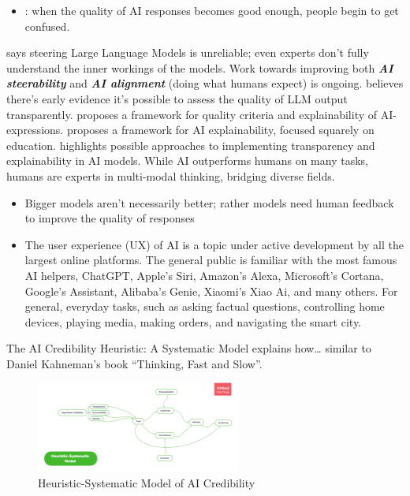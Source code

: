 \documentclass[
  letterpaper,
  DIV=11,
  numbers=noendperiod]{scrartcl}
\providecommand{\tightlist}{%
  \setlength{\itemsep}{0pt}\setlength{\parskip}{0pt}}\usepackage{longtable,booktabs,array}
\begin{document}
\begin{itemize}
\tightlist
\item
  \citet{tristangreeneConfusedReplikaAI2022}: when the quality of AI
  responses becomes good enough, people begin to get confused.
\end{itemize}

\citet{bowmanEightThingsKnow2023} says steering Large Language Models is
unreliable; even experts don't fully understand the inner workings of
the models. Work towards improving both \textbf{\emph{AI steerability}}
and \textbf{\emph{AI alignment}} (doing what humans expect) is ongoing.
\citet{liangHolisticEvaluationLanguage2022} believes there's early
evidence it's possible to assess the quality of LLM output
transparently. \citet{CABITZA2023118888} proposes a framework for
quality criteria and explainability of AI-expressions.
\citet{khosraviExplainableArtificialIntelligence2022} proposes a
framework for AI explainability, focused squarely on education.
\citet{holzingerMultimodalCausabilityGraph2021} highlights possible
approaches to implementing transparency and explainability in AI models.
While AI outperforms humans on many tasks, humans are experts in
multi-modal thinking, bridging diverse fields.

\begin{itemize}
\item
  Bigger models aren't necessarily better; rather models need human
  feedback to improve the quality of responses
  \citet{ouyangTrainingLanguageModels2022}
\item
  The user experience (UX) of AI is a topic under active development by
  all the largest online platforms. The general public is familiar with
  the most famous AI helpers, ChatGPT, Apple's Siri, Amazon's Alexa,
  Microsoft's Cortana, Google's Assistant, Alibaba's Genie, Xiaomi's
  Xiao Ai, and many others. For general, everyday tasks, such as asking
  factual questions, controlling home devices, playing media, making
  orders, and navigating the smart city.
\end{itemize}

The AI Credibility Heuristic: A Systematic Model explains how\ldots{}
similar to Daniel Kahneman's book ``Thinking, Fast and Slow''.

\begin{figure}[H]

{\centering \includegraphics[width=0.6\textwidth,height=\textheight]{./images/ai-credibility.png}

}

\caption{Heuristic-Systematic Model of AI Credibility}

\end{figure}%
\end{document}
